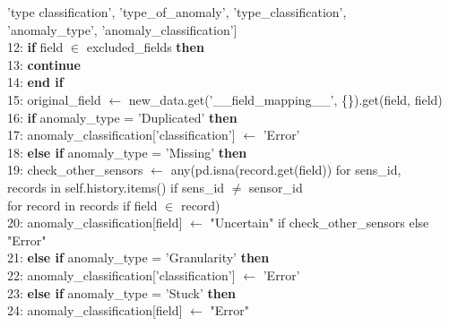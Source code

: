 \begin{breakablealgorithm}
\begin{flushleft}
\hspace{1.5em} 'type classification', 'type\_of\_anomaly', 'type\_classification', \\
\hspace{1.5em} 'anomaly\_type', 'anomaly\_classification'] \\
12: \hspace{1em} \textbf{if} field $\in$ excluded\_fields \textbf{then} \\
13: \hspace{1.5em} \textbf{continue} \\
14: \hspace{1em} \textbf{end if} \\
15: \hspace{1em} original\_field $\gets$ new\_data.get('\_\_field\_mapping\_\_', \{\}).get(field, field) \\
16: \hspace{1em} \textbf{if} anomaly\_type = 'Duplicated' \textbf{then} \\
17: \hspace{1.5em} anomaly\_classification['classification'] $\gets$ 'Error' \\
18: \hspace{1em} \textbf{else if} anomaly\_type = 'Missing' \textbf{then} \\
19: \hspace{1.5em} check\_other\_sensors $\gets$ any(pd.isna(record.get(field)) for sens\_id, \\
\hspace{2em} records in self.history.items() if sens\_id $\neq$ sensor\_id \\
\hspace{2em} for record in records if field $\in$ record) \\
20: \hspace{1.5em} anomaly\_classification[field] $\gets$ "Uncertain" if check\_other\_sensors else "Error" \\
21: \hspace{1em} \textbf{else if} anomaly\_type = 'Granularity' \textbf{then} \\
22: \hspace{1.5em} anomaly\_classification['classification'] $\gets$ 'Error' \\
23: \hspace{1em} \textbf{else if} anomaly\_type = 'Stuck' \textbf{then} \\
24: \hspace{1.5em} anomaly\_classification[field] $\gets$ "Error" \\

\end{flushleft}
\end{breakablealgorithm}
